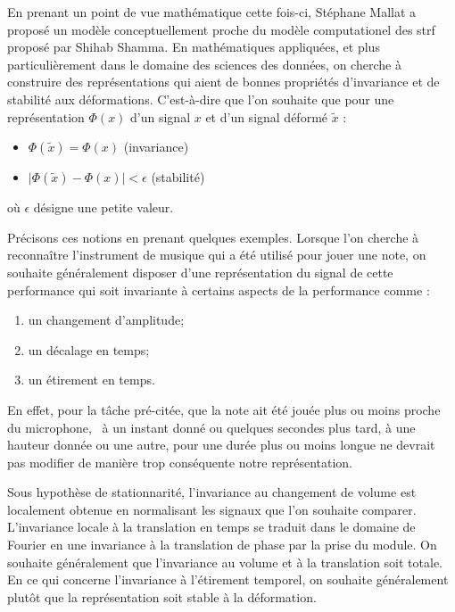 En prenant un point de vue mathématique cette fois-ci, Stéphane Mallat a proposé un modèle conceptuellement proche du modèle computationel des strf proposé par Shihab Shamma. En mathématiques appliquées, et plus particulièrement dans le domaine des sciences des données, on cherche à construire des représentations qui aient de bonnes propriétés d'invariance et de stabilité aux déformations. C'est-à-dire que l'on souhaite que pour une représentation $\Phi(x)$ d'un signal $x$ et d'un signal déformé $\tilde x$ :
\begin{itemize}
  \item $\Phi(\tilde x) = \Phi(x)$ (invariance)
  \item $ \vert \Phi(\tilde x) - \Phi(x) | < \epsilon $ (stabilité)
\end{itemize}
où $\epsilon$ désigne une petite valeur.

Précisons ces notions en prenant quelques exemples. Lorsque l'on cherche à reconnaître l'instrument de musique qui a été utilisé pour jouer une note, on souhaite généralement disposer d'une représentation du signal de cette performance qui soit invariante à certains aspects de la performance comme :
\begin{enumerate}
  \item un changement d'amplitude;
  \item un décalage en temps;
  \item un étirement en temps.
\end{enumerate}
En effet, pour la tâche pré-citée, que la note ait été jouée plus ou moins proche du microphone,~ à un instant donné ou quelques secondes plus tard, à une hauteur donnée ou une autre, pour une durée plus ou moins longue ne devrait pas modifier de manière trop conséquente notre représentation.

Sous hypothèse de stationnarité, l'invariance au changement de volume est localement obtenue en normalisant les signaux que l'on souhaite comparer. L'invariance locale à la translation en temps se traduit dans le domaine de Fourier en une invariance à la translation de phase par la prise du module. On souhaite généralement que l'invariance au volume et à la translation soit totale. En ce qui concerne l'invariance à l'étirement temporel, on souhaite généralement plutôt que la représentation soit stable à la déformation.

